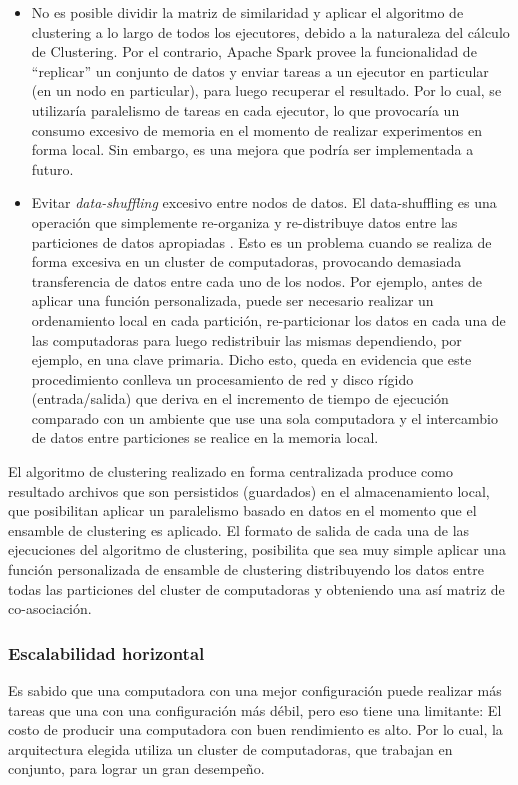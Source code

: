 \begin{itemize}
	\item No es posible dividir la matriz de similaridad y aplicar el algoritmo de clustering a lo largo de todos los ejecutores, debido a la naturaleza del cálculo de Clustering. Por el contrario, Apache Spark provee la funcionalidad de ``replicar'' un conjunto de datos y enviar tareas a un ejecutor en particular (en un nodo en particular), para luego recuperar el resultado. Por lo cual, se utilizaría paralelismo de tareas en cada ejecutor, lo que provocaría un consumo excesivo de memoria en el momento de realizar experimentos en forma local. Sin embargo, es una mejora que podría ser implementada a futuro.
	\item Evitar \textit{data-shuffling} excesivo entre nodos de datos. El data-shuffling es una operación que simplemente re-organiza y re-distribuye datos entre las particiones de datos apropiadas \citep{zhang2012optimizing}. Esto es un problema cuando se realiza de forma excesiva en un cluster de computadoras, provocando demasiada transferencia de datos entre cada uno de los nodos. Por ejemplo, antes de aplicar una función personalizada, puede ser necesario realizar un ordenamiento local en cada partición, re-particionar los datos en cada una de las computadoras para luego redistribuir las mismas dependiendo, por ejemplo, en una clave primaria. Dicho esto, queda en evidencia que este procedimiento conlleva un procesamiento de red y disco rígido (entrada/salida) que deriva en el incremento de tiempo de ejecución comparado con un ambiente que use una sola computadora y el intercambio de datos entre particiones se realice en la memoria local.
\end{itemize}

\bigskip El algoritmo de clustering realizado en forma centralizada produce como resultado archivos que son persistidos (guardados) en el almacenamiento local, que posibilitan aplicar un paralelismo basado en datos en el momento que el ensamble de clustering es aplicado. El formato de salida de cada una de las ejecuciones del algoritmo de clustering, posibilita que sea muy simple aplicar una función personalizada de ensamble de clustering distribuyendo los datos entre todas las particiones del cluster de computadoras y obteniendo una así matriz de co-asociación.

\subsubsection{Escalabilidad horizontal}
Es sabido que una computadora con una mejor configuración puede realizar más tareas que una con una configuración más débil, pero eso tiene una limitante: El costo de producir una computadora con buen rendimiento es alto. Por lo cual, la arquitectura elegida utiliza un cluster de computadoras, que trabajan en conjunto, para lograr un gran desempeño.

